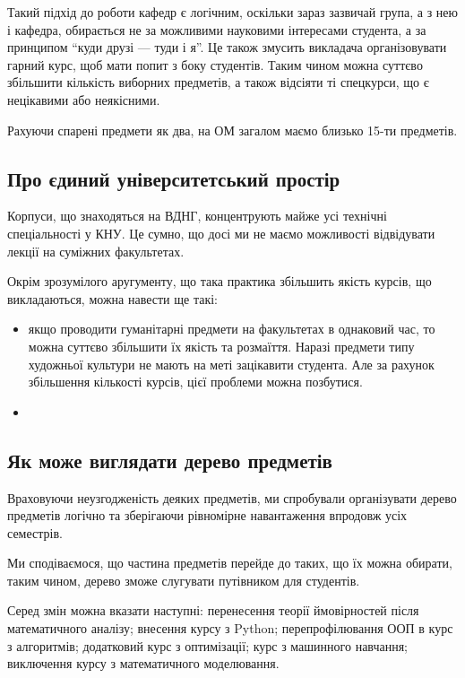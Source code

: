 \documentclass[14pt, a4paper]{extarticle}  %
\begin{document}
Такий підхід до роботи кафедр є логічним, оскільки зараз зазвичай група, а з нею і кафедра, обирається не за можливими науковими інтересами студента, а за принципом ``куди друзі --- туди і я''. Це також змусить викладача організовувати гарний курс, щоб мати попит з боку студентів. Таким чином можна суттєво збільшити кількість виборних предметів, а також відсіяти ті спецкурси, що є нецікавими або неякісними.

Рахуючи спарені предмети як два, на ОМ загалом маємо близько 15-ти предметів. 

\subsection{Про єдиний університетський простір}
\label{common_space}
Корпуси, що знаходяться на ВДНГ, концентрують майже усі технічні спеціальності у КНУ. Це сумно, що досі ми не маємо можливості відвідувати лекції на суміжних факультетах. 

Окрім зрозумілого аругументу, що така практика збільшить якість курсів, що викладаються, можна навести ще такі:
\begin{itemize}
    \item якщо проводити гуманітарні предмети на факультетах в однаковий час, то можна суттєво збільшити їх якість та розмаїття. Наразі предмети типу художньої культури не мають на меті зацікавити студента. Але за рахунок збільшення кількості курсів, цієї проблеми можна позбутися. 
    \item 
\end{itemize}


\subsection{Як може виглядати дерево предметів}
Враховуючи неузгодженість деяких предметів, ми спробували організувати дерево предметів логічно та зберігаючи рівномірне навантаження впродовж усіх семестрів.

Ми сподіваємося, що частина предметів перейде до таких, що їх можна обирати, таким чином, дерево зможе слугувати путівником для студентів.

Серед змін можна вказати наступні: перенесення теорії ймовірностей після математичного аналізу; внесення курсу з Python; перепрофілювання ООП в курс з алгоритмів; додатковий курс з оптимізації; курс з машинного навчання; виключення курсу з математичного моделювання.
\end{document}
